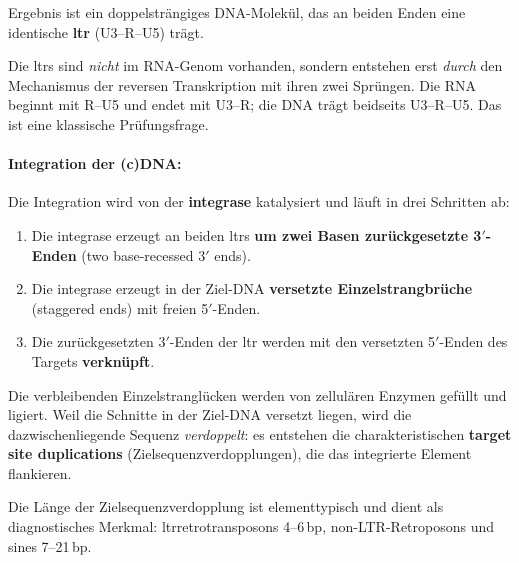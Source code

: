 Ergebnis ist ein doppelsträngiges DNA-Molekül, das an beiden Enden eine
identische \textbf{\gls{ltr}} (U3--R--U5) trägt.

\begin{bem}
    Die \gls{ltr}s sind \emph{nicht} im RNA-Genom vorhanden, sondern entstehen erst
    \emph{durch} den Mechanismus der reversen Transkription mit ihren zwei Sprüngen.
    Die RNA beginnt mit R--U5 und endet mit U3--R; die DNA trägt beidseits
    U3--R--U5. Das ist eine klassische Prüfungsfrage.
\end{bem}

\paragraph{Integration der (c)DNA:}
Die Integration wird von der \textbf{\gls{integrase}} katalysiert und läuft in drei
Schritten ab:

\begin{enumerate}
    \item Die \gls{integrase} erzeugt an beiden \gls{ltr}s \textbf{um zwei Basen
    zurückgesetzte 3$'$-Enden} (two base-recessed 3$'$ ends).
    \item Die \gls{integrase} erzeugt in der Ziel-DNA \textbf{versetzte
    Einzelstrangbrüche} (staggered ends) mit freien 5$'$-Enden.
    \item Die zurückgesetzten 3$'$-Enden der \gls{ltr} werden mit den versetzten
    5$'$-Enden des Targets \textbf{verknüpft}.
\end{enumerate}

Die verbleibenden Einzelstranglücken werden von zellulären Enzymen gefüllt und
ligiert.
Weil die Schnitte in der Ziel-DNA versetzt liegen, wird die
dazwischenliegende Sequenz \emph{verdoppelt}: es entstehen die charakteristischen
\textbf{target site duplications} (Zielsequenzverdopplungen), die das
integrierte Element flankieren.

\begin{bem}
    Die Länge der Zielsequenzverdopplung ist elementtypisch und dient als
    diagnostisches Merkmal: \gls{ltrretrotransposon}s 4--6\,bp, non-LTR-Retroposons und
    \gls{sine}s 7--21\,bp.
\end{bem}

